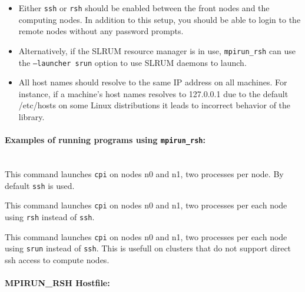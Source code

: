 \begin{itemize}
  \item {Either \texttt{ssh} or \texttt{rsh} should be
    enabled between the front nodes and the
    computing nodes. In addition to this setup, you
    should be able to login to the remote nodes
    without any password prompts. }
  \item {Alternatively, if the SLRUM resource manager is in use, 
    \texttt{mpirun\_rsh} can use the \texttt{--launcher srun} option 
	to use SLRUM daemons to launch. }
  \item {All host names should resolve to the same IP address on all
    machines. For instance, if a machine's host names resolves to
    127.0.0.1 due to the default /etc/hosts on some Linux
    distributions it leads to incorrect behavior of the library. }
\end{itemize}

\paragraph{Examples of running programs using \texttt{mpirun\_rsh}:\\\\}

\indent{}

This command launches \texttt{cpi} on nodes n0 and n1,
two processes per node.  By default \texttt{ssh} is used.


This command launches \texttt{cpi} on nodes n0 and n1,
two processes per each node using \texttt{rsh} instead of \texttt{ssh}.

This command launches \texttt{cpi} on nodes n0 and n1,
two processes per each node using \texttt{srun} instead of \texttt{ssh}.
This is usefull on clusters that do not support direct ssh access to 
compute nodes. 

\paragraph{MPIRUN\_RSH Hostfile:\\\\}


